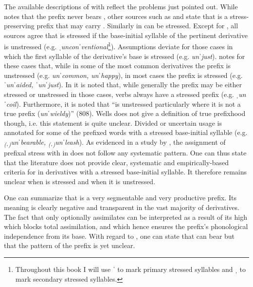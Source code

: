 The available descriptions of  with  reflect the problems just pointed out. While \citet[4]{Allen.1978} notes that the prefix never bears , other sources such as \citet[464 f]{Jespersen.1965} and \citet[126]{Okada.2013} state that  is a stress-preserving prefix that may carry . Similarly in \cite{Wells.2008}  can be stressed. Except for \cite{Allen.1978}, all sources agree that  is stressed if the base-initial syllable of the pertinent derivative is unstressed (e.g. \textit{ˌunconˈventional}\footnote{Throughout this book I will use ˈ to mark primary stressed syllables and ˌ to mark secondary stressed syllables.}).
Assumptions deviate for those cases in which the first syllable of the derivative's base is stressed (e.g. \textit{unˈjust}). \citet[464 f]{Jespersen.1965} notes for these cases that, while in some of the most common derivatives the prefix is unstressed (e.g. \textit{unˈcommon, unˈhappy}), in most cases the prefix is stressed (e.g. \textit{ˈunˈaided, ˈunˈjust}). 
In \citet[808]{Wells.2008} it is noted that, while generally the prefix may be either stressed or unstressed in those cases, verbs always have a stressed prefix (e.g. \textit{ˌunˈcoil}). Furthermore, it is noted that  ``is unstressed particularly where it is not a true prefix (\textit{unˈwieldy})'' (808). Wells does not give a definition of true prefixhood though, i.e. this statement is quite unclear. Divided or uncertain usage is annotated for some of the prefixed words with a stressed base-initial syllable (e.g. \textit{\textsubscript{(}ˌ\textsubscript{)}unˈbearable, \textsubscript{(}ˌ\textsubscript{)}unˈleash}). As evidenced in a study by \citet[2 ff]{Hanote.2010}, the assignment of prefixal stress with  in \cite{Wells.2008} does not follow any systematic pattern.
One can thus state that the literature does not provide clear, systematic and empirically-based criteria for  in derivatives with a stressed base-initial syllable. It therefore remains unclear when  is stressed and when it is unstressed. 


One can summarize that  is a very segmentable and very productive prefix. Its meaning is clearly negative and transparent in the vast majority of derivatives. The fact that  only optionally assimilates can be interpreted as a result of its high  which blocks total assimilation, and  which hence ensures the prefix's phonological independence from its base. With regard to , one can state that  can bear  but that the  pattern of the prefix is yet unclear.



